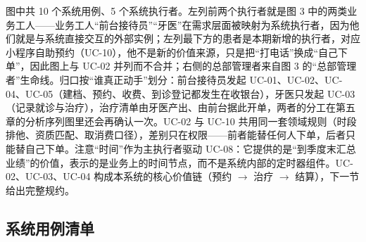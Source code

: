 \documentclass[11pt,a4paper]{ctexart}
\newcommand{\figtag}[1]{%
  \tikz[baseline=-0.35ex]{\node[fill=adcblue!90,text=white,rounded corners=1.5pt,
    inner xsep=5pt,inner ysep=1.2pt,font=\scriptsize\bfseries]{#1};}\hspace{2pt}}
\begin{document}
\figtag{图 4 说明} 图中共 10 个系统用例、5 个系统执行者。左列前两个执行者就是图 3 中的两类业务工人——业务工人“前台接待员”“牙医”在需求层面被映射为系统执行者，因为他们就是与系统直接交互的外部实例；左列最下方的患者是本期新增的执行者，对应小程序自助预约（UC-10），他不是新的价值来源，只是把“打电话”换成“自己下单”，因此图上与 UC-02 并列而不合并；右侧的总部管理者来自图 3 的“总部管理者”生命线。归口按“谁真正动手”划分：前台接待员发起 UC-01、UC-02、UC-04、UC-05（建档、预约、收费、到诊登记都发生在收银台），牙医只发起 UC-03（记录就诊与治疗），治疗清单由牙医产出、由前台据此开单，两者的分工在第五章的分析序列图里还会再确认一次。UC-02 与 UC-10 共用同一套领域规则（时段排他、资质匹配、取消费口径），差别只在权限——前者能替任何人下单，后者只能替自己下单。注意“时间”作为主执行者驱动 UC-08：它提供的是“到季度末汇总业绩”的价值，表示的是业务上的时间节点，而不是系统内部的定时器组件。UC-02、UC-03、UC-04 构成本系统的核心价值链（预约 $\rightarrow$ 治疗 $\rightarrow$ 结算），下一节给出完整规约。

\subsection{系统用例清单}
\end{document}
